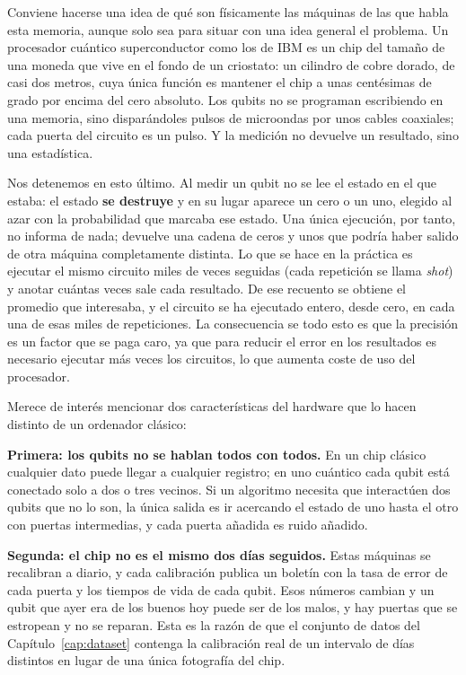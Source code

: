 Conviene hacerse una idea de qué son físicamente las máquinas de las que habla esta
memoria, aunque solo sea para situar con una idea general el problema. Un procesador cuántico
superconductor como los de IBM es un chip del tamaño de una moneda que vive en el fondo de
un criostato: un cilindro de cobre dorado, de casi dos metros, cuya única función es
mantener el chip a unas centésimas de grado por encima del cero absoluto. Los qubits no se
programan escribiendo en una memoria, sino disparándoles pulsos de microondas por unos
cables coaxiales; cada puerta del circuito es un pulso. Y la medición no devuelve un
resultado, sino una estadística.

Nos detenemos en esto último. Al medir un qubit no
se lee el estado en el que estaba: el estado \textbf{se destruye} y en su lugar aparece un
cero o un uno, elegido al azar con la probabilidad que marcaba ese estado. Una única
ejecución, por tanto, no informa de nada; devuelve una cadena de ceros y unos que podría
haber salido de otra máquina completamente distinta. Lo que se hace en la práctica es
ejecutar el mismo circuito miles de veces seguidas (cada repetición se llama
\emph{shot}) y anotar cuántas veces sale cada resultado. De ese recuento se obtiene el
promedio que interesaba, y el circuito se ha ejecutado entero, desde cero, en cada una de
esas miles de repeticiones. La consecuencia se todo esto es que la precisión es un factor que se paga caro, ya que para reducir el error
en los resultados es necesario ejecutar más veces los circuitos, lo que aumenta coste de uso del procesador.

Merece de interés mencionar dos características del hardware que lo hacen distinto de un ordenador clásico:

\textbf{Primera: los qubits no se hablan todos con todos.} En un chip clásico cualquier
dato puede llegar a cualquier registro; en uno cuántico cada qubit está conectado solo a
dos o tres vecinos. Si un algoritmo necesita que interactúen dos qubits que no lo son, la
única salida es ir acercando el estado de uno hasta el otro con puertas intermedias, y cada
puerta añadida es ruido añadido.

\textbf{Segunda: el chip no es el mismo dos días seguidos.} Estas máquinas se recalibran a
diario, y cada calibración publica un boletín con la tasa de error de cada puerta y los
tiempos de vida de cada qubit. Esos números cambian y un qubit que ayer era de los
buenos hoy puede ser de los malos, y hay puertas que se estropean y no se reparan.
Esta es la razón de que el conjunto de datos del Capítulo~\ref{cap:dataset}
contenga la calibración real de un intervalo de días distintos en lugar de una única
fotografía del chip.

